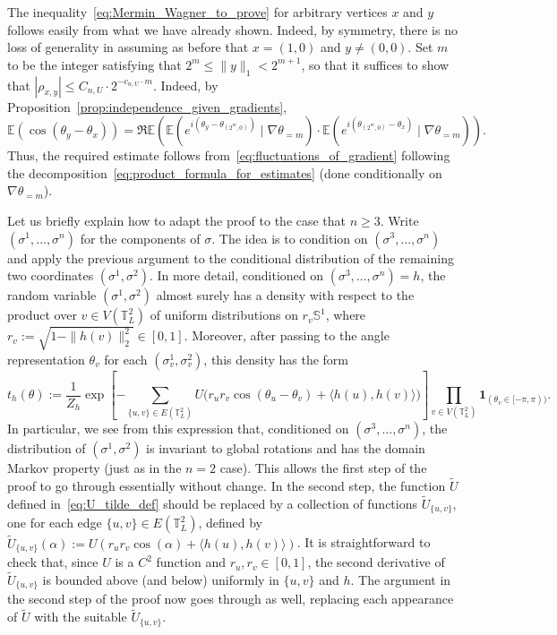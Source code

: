 \documentclass[12pt,reqno]{article}
\def\E{\mathbb{E}}
\def\T{\mathbb{T}}
\def\one{\mathbf{1}}
\renewcommand{\S}{\mathbb{S}}
\begin{document}
\medbreak
{}
The inequality~\eqref{eq:Mermin_Wagner_to_prove} for arbitrary vertices $x$ and $y$ follows easily from what we have already shown. Indeed, by symmetry, there is no loss of generality in assuming as before that $x=(1,0)$ and $y\neq(0,0)$. Set $m$ to be the integer satisfying that $2^m \le \|y\|_1 < 2^{m+1}$, so that it suffices to show that $|\rho_{x,y}| \le C_{n,U}\cdot 2^{-c_{n,U}\cdot m}$. Indeed, by Proposition~\ref{prop:independence_given_gradients},
\begin{equation*}
  \E(\cos(\theta_{y}-\theta_{x}))
 = \Re\E\left( \E\left(e^{i\left(\theta_y-\theta_{(2^{m},0)}\right)} \mid \nabla\theta_{=m} \right) \cdot \E\left(e^{i\left(\theta_{(2^m,0)}-\theta_x\right)} \mid \nabla\theta_{=m} \right)\right) .
\end{equation*}
Thus, the required estimate follows from~\eqref{eq:fluctuations_of_gradient} following the decomposition~\eqref{eq:product_formula_for_estimates} (done conditionally on $\nabla\theta_{=m}$).

Let us briefly explain how to adapt the proof to the case that $n\ge 3$. Write $(\sigma^1,\dots,\sigma^n)$ for the components of $\sigma$. The idea is to condition on $(\sigma^3,\dots,\sigma^n)$ and apply the previous argument to the conditional distribution of the remaining two coordinates $(\sigma^1,\sigma^2)$. In more detail, conditioned on $(\sigma^3,\dots,\sigma^n)=h$, the random variable $(\sigma^1,\sigma^2)$ almost surely has a density with respect to the product over $v \in V(\T_L^2)$ of uniform distributions on $r_v \S^1$, where $r_v:=\sqrt{1-\|h(v)\|_2^2}\in[0,1]$. Moreover, after passing to the angle representation $\theta_v$ for each $(\sigma^1_v,\sigma^2_v)$, this density has the form
\begin{equation*}
t_h(\theta) := \frac{1}{Z_h}\exp \left[-\sum_{\{u,v\}\in
	E(\T_L^2)}U\Big(r_u r_v \cos(\theta_u - \theta_v) + \langle h(u),h(v)\rangle\Big)\right]
\prod_{v\in V(\T_L^2)} \one_{(\theta_v\in [-\pi,\pi))}.
\end{equation*}
In particular, we see from this expression that, conditioned on $(\sigma^3,\dots,\sigma^n)$, the distribution of $(\sigma^1,\sigma^2)$ is invariant to global rotations and has the domain Markov property (just as in the $n=2$ case). This allows the first step of the proof to go through essentially without change. In the second step, the function $\tilde{U}$ defined in~\eqref{eq:U_tilde_def} should be replaced by a collection of functions $\tilde{U}_{\{u,v\}}$, one for each edge $\{u,v\} \in E(\T_L^2)$, defined by $\tilde{U}_{\{u,v\}}(\alpha) := U(r_u r_v \cos(\alpha) + \langle h(u),h(v)\rangle)$. It is straightforward to check that, since $U$ is a $C^2$ function and $r_u, r_v\in[0,1]$, the second derivative of $\tilde{U}_{\{u,v\}}$ is bounded above (and below) uniformly in $\{u,v\}$ and $h$. The argument in the second step of the proof now goes through as well, replacing each appearance of $\tilde{U}$ with the suitable $\tilde{U}_{\{u,v\}}$.
\end{document}
